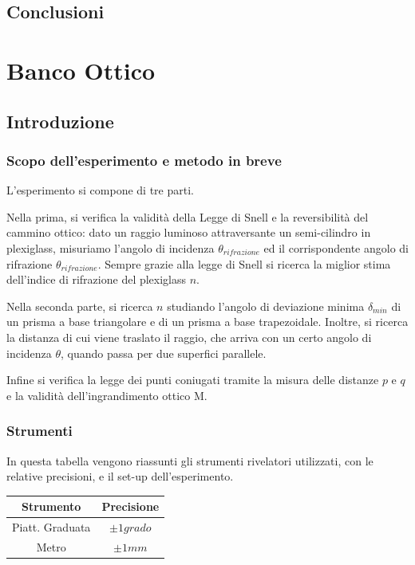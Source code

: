 \documentclass[a4paper,10pt]{report}
\begin{document}
\section{Conclusioni}

\chapter{Banco Ottico}
\section{Introduzione}
\subsection{Scopo dell'esperimento e metodo in breve}
L'esperimento si compone di tre parti.


Nella prima, si verifica la validità della Legge di Snell e la reversibilità del cammino ottico: dato un raggio luminoso attraversante un semi-cilindro in plexiglass, misuriamo l'angolo di incidenza $\theta_{rifrazione}$ ed il corrispondente  angolo di rifrazione $\theta_{rifrazione}$. Sempre grazie alla legge di Snell si ricerca la miglior stima dell'indice di rifrazione del plexiglass $n$.


Nella seconda parte, si ricerca $n$ studiando l'angolo di deviazione minima $\delta_{min}$ di un prisma a base triangolare e di un prisma a base trapezoidale. 
Inoltre, si ricerca la distanza di cui viene traslato il raggio, che arriva con un certo angolo di incidenza $\theta$, quando passa per due superfici parallele.


Infine si verifica la legge dei punti coniugati tramite la misura delle distanze $p$ e $q$ e la validità dell'ingrandimento ottico M. 

\subsection{Strumenti}
In questa tabella vengono riassunti gli strumenti rivelatori utilizzati, con le relative precisioni, e il set-up dell'esperimento.
\begin{center}
\begin{tabular}{c|c}
Strumento & Precisione \\
\midrule
Piatt. Graduata & $\pm 1 grado $ \\
Metro & $\pm 1 mm $\\
\end{tabular}
\end{center}
\end{document}
